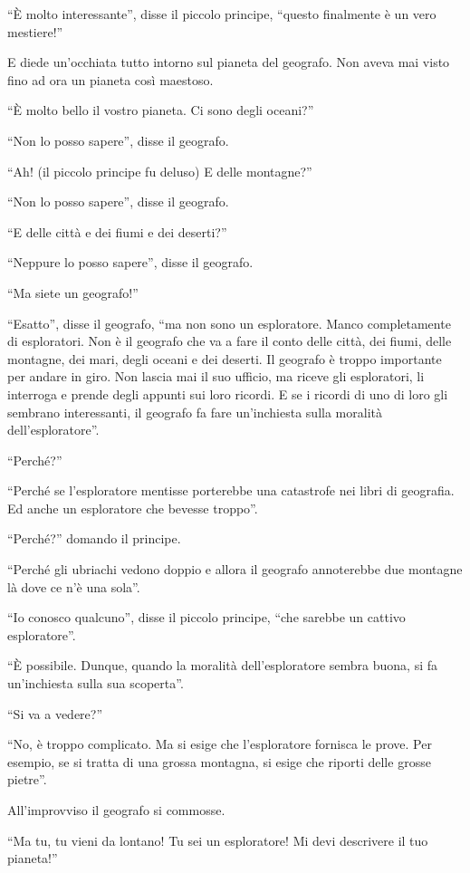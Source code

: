 \documentclass[11pt]{scrbook}
\begin{document}
``È molto interessante'', disse il piccolo principe, ``questo finalmente è un vero mestiere!''

E diede un'occhiata tutto intorno sul pianeta del geografo. Non aveva mai visto fino ad ora un pianeta così maestoso.

``È molto bello il vostro pianeta. Ci sono degli oceani?''

``Non lo posso sapere'', disse il geografo.

``Ah! (il piccolo principe fu deluso) E delle montagne?''

``Non lo posso sapere'', disse il geografo.

``E delle città e dei fiumi e dei deserti?''

``Neppure lo posso sapere'', disse il geografo.

``Ma siete un geografo!''

``Esatto'', disse il geografo, ``ma non sono un esploratore. Manco completamente di esploratori. Non è il geografo che va a fare il conto delle città, dei fiumi, delle montagne, dei mari, degli oceani e dei deserti. Il geografo è troppo importante per andare in giro. Non lascia mai il suo ufficio, ma riceve gli esploratori, li interroga e prende degli appunti sui loro ricordi. E se i ricordi di uno di loro gli sembrano interessanti, il geografo fa fare un'inchiesta sulla moralità dell'esploratore''.

``Perché?''

``Perché se l'esploratore mentisse porterebbe una catastrofe nei libri di geografia. Ed anche un esploratore che bevesse troppo''.

``Perché?'' domando il principe.

``Perché gli ubriachi vedono doppio e allora il geografo annoterebbe due montagne là dove ce n'è una sola''.

``Io conosco qualcuno'', disse il piccolo principe, ``che sarebbe un cattivo esploratore''.

``È possibile. Dunque, quando la moralità dell'esploratore sembra buona, si fa un'inchiesta sulla sua scoperta''.

``Si va a vedere?''

``No, è troppo complicato. Ma si esige che l'esploratore fornisca le prove. Per esempio, se si tratta di una grossa montagna, si esige che riporti delle grosse pietre''.

All'improvviso il geografo si commosse.

``Ma tu, tu vieni da lontano! Tu sei un esploratore! Mi devi descrivere il tuo pianeta!''
\end{document}
